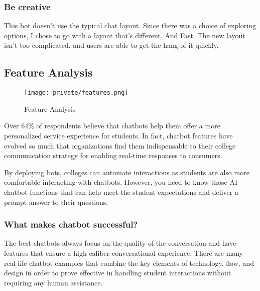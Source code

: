 \documentclass[14pt]{extarticle}
\begin{document}
\subsubsection{Be creative}
This bot doesn't use the typical chat layout. Since there was a choice of exploring options, I chose to go with a layout that's different. And Fast. The new layout isn't too complicated, and users are able to get the hang of it quickly.

\subsection{Feature Analysis}


\begin{figure}[!htb]
    \begin{center}
        \texttt{[image: private/features.png]}
    \end{center}
    \caption{Feature Analysis}
\end{figure}

Over 64\% of respondents believe that chatbots help them offer a more personalized service experience for students.  In fact, chatbot features have evolved so much that organizations find them indispensable to their college communication strategy for enabling real-time responses to consumers.

By deploying bots, colleges can automate interactions as students are also more comfortable interacting with chatbots. However, you need to know those AI chatbot functions that can help meet the student expectations and deliver a prompt answer to their questions.

\subsubsection{What makes chatbot successful?}

The best chatbots always focus on the quality of the conversation and have features that ensure a high-caliber conversational experience. There are many real-life chatbot examples that combine the key elements of technology, flow, and design in order to prove effective in handling student interactions without requiring any human assistance.
\end{document}
